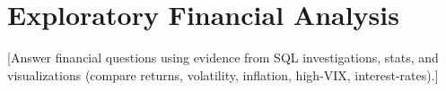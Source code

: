 \section{Exploratory Financial Analysis}
{} [Answer financial questions using evidence from SQL investigations, stats, and visualizations (compare returns, volatility, inflation, high-VIX, interest-rates).]

\begin{Shaded}
\begin{Highlighting}[]
\end{Highlighting}
\end{Shaded}
